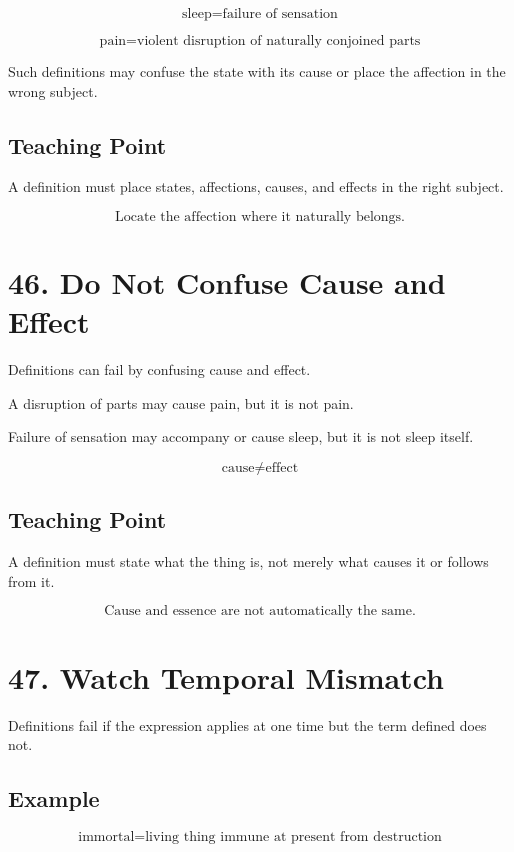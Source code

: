 \documentclass[12pt]{article}
\begin{document}
\[
\text{sleep} = \text{failure of sensation}
\]

\[
\text{pain} = \text{violent disruption of naturally conjoined parts}
\]

Such definitions may confuse the state with its cause or place the affection in
the wrong subject.

\subsection*{Teaching Point}

A definition must place states, affections, causes, and effects in the right
subject.

\[
\boxed{
\text{Locate the affection where it naturally belongs.}
}
\]

\section*{46. Do Not Confuse Cause and Effect}

Definitions can fail by confusing cause and effect.

A disruption of parts may cause pain, but it is not pain.

Failure of sensation may accompany or cause sleep, but it is not sleep itself.

\[
\text{cause} \neq \text{effect}
\]

\subsection*{Teaching Point}

A definition must state what the thing is, not merely what causes it or follows
from it.

\[
\boxed{
\text{Cause and essence are not automatically the same.}
}
\]

\section*{47. Watch Temporal Mismatch}

Definitions fail if the expression applies at one time but the term defined does
not.

\subsection*{Example}

\[
\text{immortal} = \text{living thing immune at present from destruction}
\]
\end{document}
